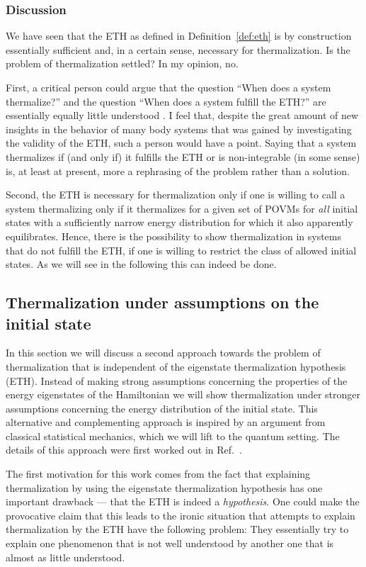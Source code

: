 \documentclass[a4paper,12pt,listof=totoc,index=totoc,bibliography=totoc,headsepline=false,headings=normal,BCOR16.153846mm,DIV12,headinclude,twoside,cleardoublepage=empty,numbers=noenddot,final]{scrreprt}
\theoremstyle{mystyle}
\numberwithin{equation}{section}
\numberwithin{figure}{section}
\numberwithin{lemma}{section}
\numberwithin{theorem}{section}
\numberwithin{corollary}{section}
\numberwithin{definition}{section}
\numberwithin{conjecture}{section}
\numberwithin{observation}{section}
\newcommand{\+}{\mkern2mu}
\DeclareMathOperator{\1}{\mathds{1}}
\begin{document}
\subsubsection*{Discussion}
%
We have seen that the ETH as defined in Definition~\ref{def:eth} is by construction essentially sufficient and, in a certain sense, necessary for thermalization.
Is the problem of thermalization settled? 
In my opinion, no.

First, a critical person could argue that the question ``When does a system thermalize?'' and the question ``When does a system fulfill the ETH?'' are essentially equally little understood \cite{Singh}. 
I feel that, despite the great amount of new insights in the behavior of many body systems that was gained by investigating the validity of the ETH, such a person would have a point.
Saying that a system thermalizes if (and only if) it fulfills the ETH or is non-integrable (in some sense) is, at least at present, more a rephrasing of the problem rather than a solution.

Second, the ETH is necessary for thermalization only if one is willing to call a system thermalizing only if it thermalizes for a given set of POVMs for \emph{all} initial states with a sufficiently narrow energy distribution for which it also apparently equilibrates.
Hence, there is the possibility to show thermalization in systems that do not fulfill the ETH, if one is willing to restrict the class of allowed initial states.
As we will see in the following this can indeed be done. 


\subsection{Thermalization under assumptions on the initial state}
\label{sec:thermalizationunderassumptionsontheinitialstate}
%
In this section we will discuss a second approach towards the problem of thermalization that is independent of the eigenstate thermalization hypothesis (ETH).
Instead of making strong assumptions concerning the properties of the energy eigenstates of the Hamiltonian we will show thermalization under stronger assumptions concerning the energy distribution of the initial state.
This alternative and complementing approach is inspired by an argument from classical statistical mechanics, which we will lift to the quantum setting.
The details of this approach were first worked out in Ref.~\cite{Riera2012}.

The first motivation for this work comes from the fact that explaining thermalization by using the eigenstate thermalization hypothesis has one important drawback --- that the ETH is indeed a \emph{hypothesis}.
One could make the provocative claim that this leads to the ironic situation that attempts to explain thermalization by the ETH have the following problem:
They essentially try to explain one phenomenon that is not well understood by another one that is almost as little understood.
\end{document}
